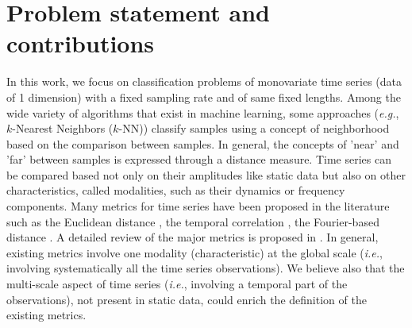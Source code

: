 \section*{Problem statement and contributions}
In this work, we focus on classification problems of monovariate time series (data of 1 dimension) with a fixed sampling rate and of same fixed lengths. Among the wide variety of algorithms that exist in machine learning, some approaches (\textit{e.g.}, $k$-Nearest Neighbors ($k$-NN)) classify samples using a concept of neighborhood based on the comparison between samples. In general, the concepts of 'near' and 'far' between samples is expressed through a distance measure. Time series can be compared based not only on their amplitudes like static data but also on other characteristics, called modalities, such as their dynamics or frequency components. Many metrics for time series have been proposed in the literature such as the Euclidean distance \cite{Ding2008}, the temporal correlation \cite{Frambourg2013a}, the Fourier-based distance \cite{Sahidullah2012a}. A detailed review of the major metrics is proposed in \cite{Montero2014}. In general, existing metrics involve one modality (characteristic) at the global scale (\textit{i.e.}, involving systematically all the time series observations). We believe also that the multi-scale aspect of time series (\textit{i.e.}, involving a temporal part of the observations), not present in static data, could enrich the definition of the existing metrics. 


